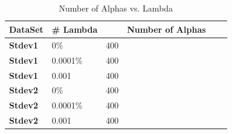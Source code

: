 \documentclass[pageno]{jpaper}
\begin{document}
\subsection{}
\begin{table}[h!]
  \centering
  \begin{tabular}{llllll|}
    \hline
     \textbf{DataSet} &\textbf{\# Lambda}  & & \textbf{Number of Alphas} \\
    \hline
    \hline

  \textbf{Stdev1} 	 & 0\%  &400\\
 \hline
  \textbf{Stdev1} 	 &0.0001\% &400  \\
 \hline
  \textbf{Stdev1} 	&0.001 &400  \\
 \hline
   \textbf{Stdev2} 	 & 0\%  &400\\
 \hline
  \textbf{Stdev2} 	 &0.0001\% &400  \\
 \hline
  \textbf{Stdev2} 	&0.001 &400  \\
 \hline
 \hline
 \end{tabular}
  \caption{Number of Alphas vs. Lambda}
  \label{table:formatting}
\end{table}
\end{document}

